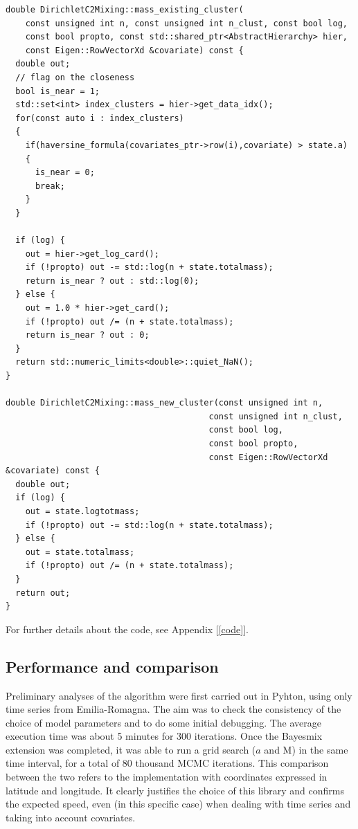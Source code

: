 \documentclass[12pt,a4paper]{article}
\begin{document}
\begin{lstlisting} 
double DirichletC2Mixing::mass_existing_cluster(
    const unsigned int n, const unsigned int n_clust, const bool log,
    const bool propto, const std::shared_ptr<AbstractHierarchy> hier,
    const Eigen::RowVectorXd &covariate) const {
  double out;
  // flag on the closeness
  bool is_near = 1;
  std::set<int> index_clusters = hier->get_data_idx();
  for(const auto i : index_clusters)
  {
    if(haversine_formula(covariates_ptr->row(i),covariate) > state.a)
    {
      is_near = 0;
      break;
    }
  }

  if (log) {
    out = hier->get_log_card();
    if (!propto) out -= std::log(n + state.totalmass);
    return is_near ? out : std::log(0);
  } else {
    out = 1.0 * hier->get_card();
    if (!propto) out /= (n + state.totalmass);
    return is_near ? out : 0;
  }
  return std::numeric_limits<double>::quiet_NaN();
}

double DirichletC2Mixing::mass_new_cluster(const unsigned int n,
                                         const unsigned int n_clust,
                                         const bool log,
                                         const bool propto,
                                         const Eigen::RowVectorXd &covariate) const {
  double out;
  if (log) {
    out = state.logtotmass;
    if (!propto) out -= std::log(n + state.totalmass);
  } else {
    out = state.totalmass;
    if (!propto) out /= (n + state.totalmass);
  }
  return out;
}
\end{lstlisting}

For further details about the code, see Appendix [\ref{code}].


\subsection{Performance and comparison}

Preliminary analyses of the algorithm were first carried out in Pyhton, using only time series from Emilia-Romagna. The aim was to check the consistency of the choice of model parameters and to do some initial debugging. The average execution time was about 5 minutes for 300 iterations. Once the Bayesmix extension was completed, it was able to run a grid search ($a$ and M) in the same time interval, for a total of 80 thousand MCMC iterations. This comparison between the two refers to the implementation with coordinates expressed in latitude and longitude.
It clearly justifies the choice of this library and confirms the expected speed, even (in this specific case) when dealing with time series and taking into account covariates. 
\end{document}
